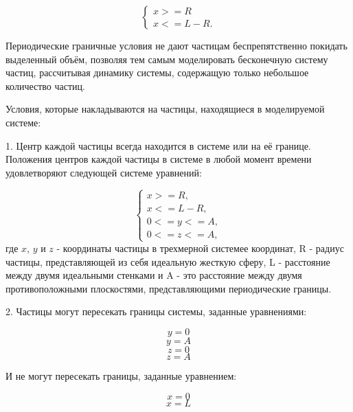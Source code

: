 \documentclass{article}
\begin{document}
\begin{equation}\label{eq:particles_and_ideal_wall}
    \begin{cases}
        x >= R
        \\
        x <= L - R.
    \end{cases}
\end{equation}

Периодические граничные условия не дают частицам беспрепятственно покидать выделенный объём, позволяя тем самым моделировать бесконечную систему частиц, рассчитывая динамику системы, содержащую только небольшое количество частиц.

Условия, которые накладываются на частицы, находящиеся в моделируемой системе:

1. Центр каждой частицы всегда находится в системе или на её границе. Положения центров каждой частицы в системе в любой момент времени удовлетворяют следующей системе уравнений:

\begin{equation}
    \begin{cases}
        x >= R,
        \\
        x <= L - R,
        \\
        0 <= y <= A,
        \\
        0 <= z <= A,
    \end{cases}
\end{equation}
где $ x $, $ y $ и $ z $ - координаты частицы в трехмерной системее координат, R - радиус частицы, представляющей из себя идеальную жесткую сферу, L - расстояние между двумя идеальными стенками и A - это расстояние между двумя противоположными плоскостями, представляющими периодические границы.

2. Частицы могут пересекать границы системы, заданные уравнениями:

\begin{equation}
y = 0
\end{equation}
\begin{equation}
y = A
\end{equation}
\begin{equation}
z = 0
\end{equation}
\begin{equation}
z = A
\end{equation}

И не могут пересекать границы, заданные уравнением:

\begin{equation}
x = 0
\end{equation}
\begin{equation}
x = L
\end{equation}
\end{document}

